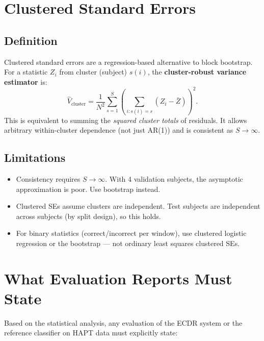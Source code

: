 \documentclass[11pt, a4paper]{article}
\theoremstyle{definition}
\theoremstyle{plain}
\begin{document}
\section{Clustered Standard Errors}

\subsection{Definition}

Clustered standard errors are a regression-based alternative to block bootstrap.
For a statistic $Z_i$ from cluster (subject) $s(i)$, the \textbf{cluster-robust
variance estimator} is:
\begin{equation}
  \hat{V}_{\text{cluster}} = \frac{1}{N^2} \sum_{s=1}^{S} \left(\sum_{i: s(i) = s} (Z_i - \bar{Z})\right)^2.
\end{equation}
This is equivalent to summing the \emph{squared cluster totals} of residuals.
It allows arbitrary within-cluster dependence (not just AR(1)) and is consistent
as $S \to \infty$.

\subsection{Limitations}

\begin{itemize}[leftmargin=1.5em]
  \item Consistency requires $S \to \infty$. With 4 validation subjects, the
        asymptotic approximation is poor. Use bootstrap instead.
  \item Clustered SEs assume clusters are independent. Test subjects are
        independent across subjects (by split design), so this holds.
  \item For binary statistics (correct/incorrect per window), use clustered logistic
        regression or the bootstrap — not ordinary least squares clustered SEs.
\end{itemize}

\section{What Evaluation Reports Must State}

Based on the statistical analysis, any evaluation of the ECDR system or the
reference classifier on HAPT data must explicitly state:
\end{document}
